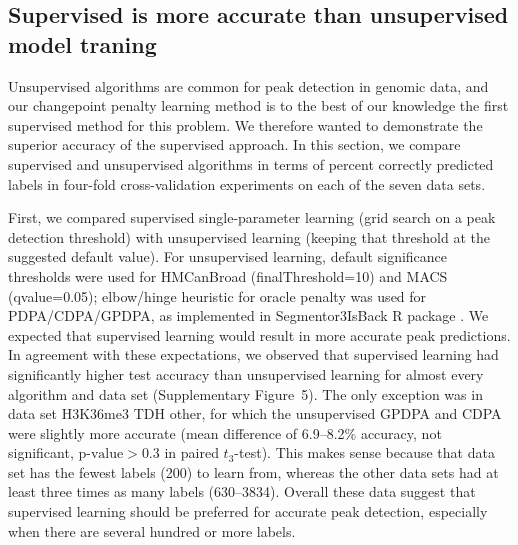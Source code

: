 \documentclass[twoside,11pt]{article}
\begin{document}
\subsection{Supervised is more accurate than unsupervised model traning}
\label{sec:test-accuracy}
Unsupervised algorithms are common for peak detection in genomic data,
and our changepoint penalty learning method is to the best of our
knowledge the first supervised method for this problem. We therefore
wanted to demonstrate the superior accuracy of the supervised
approach. In this section, we compare supervised and unsupervised
algorithms in terms of percent correctly predicted labels in four-fold
cross-validation experiments on each of the seven data sets.
 
First, we compared supervised single-parameter learning (grid search
on a peak detection threshold) with unsupervised
learning (keeping that threshold at the suggested default value). For
unsupervised learning, default significance thresholds were used for
HMCanBroad (finalThreshold=10) and MACS (qvalue=0.05); elbow/hinge
heuristic for oracle penalty was used for PDPA/CDPA/GPDPA, as
implemented in Segmentor3IsBack R package
\citep{cleynen2013segmentation}. We expected that supervised learning
would result in more accurate peak predictions. In agreement with
these expectations, we observed that supervised learning had
significantly higher test accuracy than unsupervised learning for
almost every algorithm and data set (Supplementary Figure~5). The only
exception was in data set H3K36me3 TDH other, for which the
unsupervised GPDPA and CDPA were slightly more accurate (mean
difference of 6.9--8.2\% accuracy, not significant,
$\text{p-value}>0.3$ in paired $t_3$-test). This makes sense because
that data set has the fewest labels (200) to learn from, whereas the
other data sets had at least three times as many labels
(630--3834). Overall these data suggest that supervised learning
should be preferred for accurate peak detection, especially when there
are several hundred or more labels.
\end{document}
